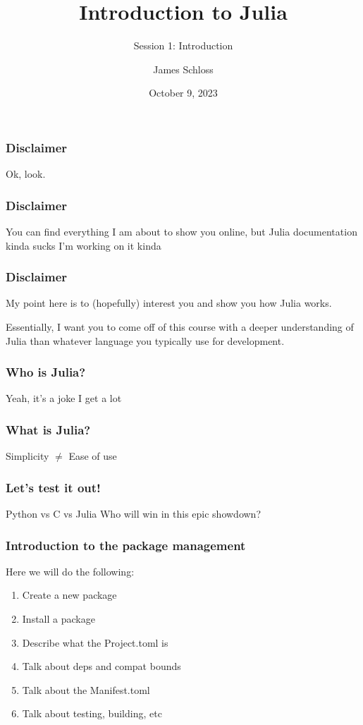 \documentclass{beamer}
\title[Intro.jl]{Introduction to Julia} %
\subtitle{Session 1: Introduction}
\author{James Schloss} %
\institute[LeiosLabs] %
{
\textit{jrs.schloss@gmail.com} %
}
\date{October 9, 2023} %
\begin{document}
\begin{frame}
\vspace*{1.4cm}
\titlepage %
\end{frame}


\begin{frame}
\frametitle{Disclaimer}
\center \Huge{Ok, look.}
\end{frame}

\begin{frame}
\frametitle{Disclaimer}
\center \Huge{You can find everything I am about to show you online, but Julia documentation kinda sucks}
\center \small{I'm working on it kinda}
\end{frame}

\begin{frame}
\frametitle{Disclaimer}

\center My point here is to (hopefully) interest you and show you how Julia works.

\pause
\center Essentially, I want you to come off of this course with a deeper understanding of Julia than whatever language you typically use for development.
\end{frame}

\begin{frame}
\frametitle{Who is Julia?}

\pause
\center \Huge{Yeah, it's a joke I get a lot}

\end{frame}

\begin{frame}
\frametitle{What is Julia?}

\pause
\center \Huge{Simplicity $\neq$ Ease of use}

\end{frame}

\begin{frame}
\frametitle{Let's test it out!}

\center \Huge{Python vs C vs Julia}
\center \small{Who will win in this epic showdown?}
\end{frame}

\begin{frame}
\frametitle{Introduction to the package management}
Here we will do the following:
\begin{enumerate}
\item Create a new package
\item Install a package
\item Describe what the Project.toml is
\item Talk about deps and compat bounds
\item Talk about the Manifest.toml
\item Talk about testing, building, etc
\end{enumerate}
\end{frame}
\end{document}
